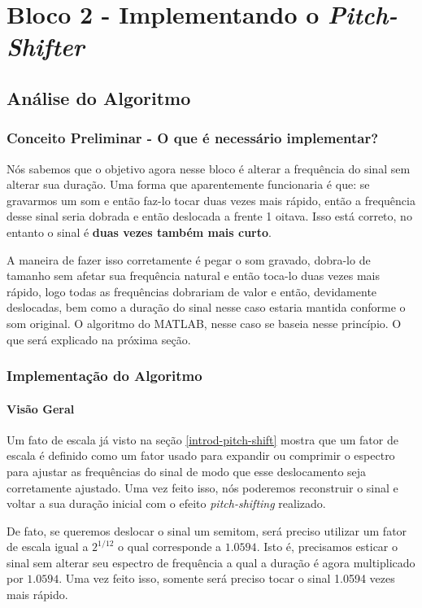 		
\section{Bloco 2 - Implementando o \textit{Pitch-Shifter}}

	\subsection{Análise do Algoritmo}
		\subsubsection{Conceito Preliminar - O que é necessário implementar?}
			
			Nós sabemos que o objetivo agora nesse bloco é alterar a frequência do sinal sem alterar sua duração. Uma forma que aparentemente funcionaria é que: se gravarmos um som e então faz-lo tocar duas vezes mais rápido, então a frequência desse sinal seria dobrada e então deslocada a frente 1 oitava. Isso está correto, no entanto o sinal é \textbf{duas vezes também mais curto}.
			
			A maneira de fazer isso corretamente é pegar o som gravado, dobra-lo de tamanho sem afetar sua frequência natural e então toca-lo duas vezes mais rápido, logo todas as frequências dobrariam de valor e então, devidamente deslocadas, bem como a duração do sinal nesse caso estaria mantida conforme o som original. O algoritmo do MATLAB, nesse caso se baseia nesse princípio. O que será explicado na próxima seção.
			
		\subsubsection{Implementação do Algoritmo}
			\paragraph{Visão Geral}		
				
				Um fato de escala já visto na seção \ref{introd-pitch-shift} mostra que um fator de escala é definido como um fator usado para expandir ou comprimir o espectro para ajustar as frequências do sinal de modo que esse deslocamento seja corretamente ajustado. Uma vez feito isso, nós poderemos reconstruir o sinal e voltar a sua duração inicial com o efeito \textit{pitch-shifting} realizado.
				
				De fato, se queremos deslocar o sinal um semitom, será preciso utilizar um fator de escala igual a $2^{1/12}$ o qual corresponde a $1.0594$. Isto é, precisamos esticar o sinal sem alterar seu espectro de frequência a qual a duração é agora multiplicado por $1.0594$. Uma vez feito isso, somente será preciso tocar o sinal 1.0594 vezes mais rápido.
				
